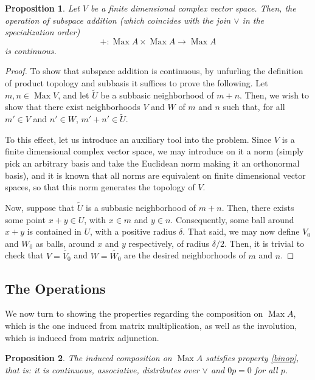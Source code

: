 \documentclass{article}
\theoremstyle{plain}
\newtheorem{prop}{Proposition}
\theoremstyle{nonumberplain}
\newtheorem{proof}{Proof}
\DeclareMathOperator{\Max}{Max}
\begin{document}
\begin{prop}
Let $V$ be a finite dimensional complex vector space. Then, the operation of subspace addition (which coincides with the join $\vee$ in the specialization order)
\[ + \colon \Max A \times \Max A \to \Max A\]
is continuous.
\end{prop}

\begin{proof}
To show that subspace addition is continuous, by unfurling the definition of product topology and subbasis it suffices to prove the following. Let $m,n \in \Max V$, and let $\tilde U$ be a subbasic neighborhood of $m+n$. Then, we wish to show that there exist neighborhoods $V$ and $W$ of $m$ and $n$ such that, for all $m' \in V$ and $n' \in W$, $m'+n' \in \tilde U$.

To this effect, let us introduce an auxiliary tool into the problem. Since $V$ is a finite dimensional complex vector space, we may introduce on it a norm (simply pick an arbitrary basis and take the Euclidean norm making it an orthonormal basis), and it is known that all norms are equivalent on finite dimensional vector spaces, so that this norm generates the topology of $V$.

Now, suppose that $\tilde U$ is a subbasic neighborhood of $m+n$. Then, there exists some point $x+y \in U$, with $x \in m$ and $y \in n$. Consequently, some ball around $x+y$ is contained in $U$, with a positive radius $\delta$. That said, we may now define $V_0$ and $W_0$ as balls, around $x$ and $y$ respectively, of radius $\delta/2$. Then, it is trivial to check that $V = \tilde{V_0}$ and $W = \tilde{W_0}$ are the desired neighborhoods of $m$ and $n$.
\end{proof}

\subsection{The Operations}

We now turn to showing the properties regarding the composition on $\Max A$, which is the one induced from matrix multiplication, as well as the involution, which is induced from matrix adjunction.

\begin{prop}
The induced composition on $\Max A$ satisfies property \ref{binop}, that is: it is continuous, associative, distributes over $\lor$ and $0p = 0$ for all $p$.
\end{prop}
\end{document}
